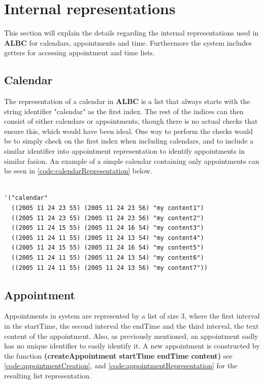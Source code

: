 \documentclass{IOS-Book-Article}
\begin{document}
\section{Internal representations} \label{sec:internalrepresentations}
This section will explain the details regarding the internal representations used in \textbf{ALBC} for calendars, appointments and time. Furthermore the system includes getters for accessing appointment and time lists.

\subsection{Calendar}
The representation of a calendar in \textbf{ALBC} is a list that always starts with the string identifier "calendar" as the first index. The rest of the indices can then consist of either calendars or appointments, though there is no actual checks that ensure this, which would have been ideal. One way to perform the checks would be to simply check on the first index when including calendars, and to include a similar identifier into appointment representation to identify appointments in similar fasion. An example of a simple calendar containing only appointments can be seen in \autoref{code:calendarRepresentation} below. \\

\begin{lstlisting}[frame=single, caption={Calendar representation}, label={code:calendarRepresentation}] 

'("calendar"
  ((2005 11 24 23 55) (2005 11 24 23 56) "my content1")
  ((2005 11 24 23 55) (2005 11 24 23 56) "my content2")
  ((2005 11 24 15 55) (2005 11 24 16 54) "my content3")
  ((2005 11 24 11 55) (2005 11 24 13 54) "my content4")
  ((2005 11 24 15 55) (2005 11 24 16 54) "my content5")
  ((2005 11 24 11 55) (2005 11 24 13 54) "my content6")
  ((2005 11 24 11 55) (2005 11 24 13 56) "my content7"))
\end{lstlisting}

\subsection{Appointment}
Appointments in system are represented by a list of size 3, where the first interval in the startTime, the second interval the endTime and the third interval, the text content of the appointment. Also, as previously mentioned, an appointment sadly has no unique identifier to easily identify it. A new appointment is constructed by the function \textbf{(createAppointment startTime endTime content)} see \autoref{code:appointmentCreation}, and \autoref{code:appointmentRepresentation} for the resulting list representation.
\end{document}
